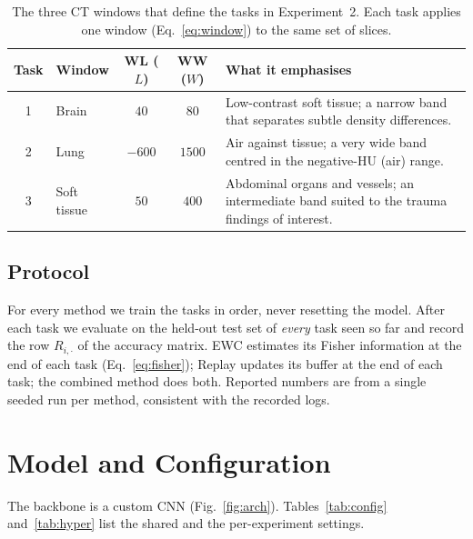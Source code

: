 \documentclass[11pt]{article}
\begin{document}
\begin{table}[H]
\centering\small
\caption{The three CT windows that define the tasks in Experiment~2. Each task
applies one window (Eq.~\eqref{eq:window}) to the same set of slices.}
\label{tab:windows}
\begin{tabular}{@{}clccp{5.6cm}@{}}
\toprule
\textbf{Task} & \textbf{Window} & \textbf{WL ($L$)} & \textbf{WW ($W$)} &
\textbf{What it emphasises}\\
\midrule
1 & Brain        & $40$   & $80$   & Low-contrast soft tissue; a narrow band that
                                     separates subtle density differences.\\
2 & Lung         & $-600$ & $1500$ & Air against tissue; a very wide band centred
                                     in the negative-HU (air) range.\\
3 & Soft tissue  & $50$   & $400$  & Abdominal organs and vessels; an intermediate
                                     band suited to the trauma findings of interest.\\
\bottomrule
\end{tabular}
\end{table}

\subsection{Protocol}
For every method we train the tasks in order, never resetting the model. After
each task we evaluate on the held-out test set of \emph{every} task seen so far
and record the row $R_{i,\cdot}$ of the accuracy matrix. EWC estimates its Fisher
information at the end of each task (Eq.~\eqref{eq:fisher}); Replay updates its
buffer at the end of each task; the combined method does both. Reported numbers
are from a single seeded run per method, consistent with the recorded logs.

\section{Model and Configuration}
The backbone is a custom CNN (Fig.~\ref{fig:arch}). Tables~\ref{tab:config}
and~\ref{tab:hyper} list the shared and the per-experiment settings.
\end{document}

